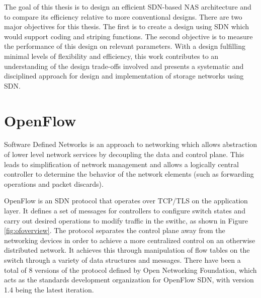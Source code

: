 The goal of this thesis is to design an efficient SDN-based NAS architecture and to compare its efficiency relative to more conventional designs. There are two major objectives for this thesis. The first is to create a design using SDN which would support coding and striping functions. The second objective is to measure the performance of this design on relevant parameters. With a design fulfilling minimal levels of flexibility and efficiency, this work contributes to an understanding of the design trade-offs involved and presents a systematic and disciplined approach for design and implementation of storage networks using SDN.


\section{OpenFlow}

\indent 
Software Defined Networks is an approach to networking which allows abstraction of lower level network services by decoupling the data and control plane. This leads to simplification of network management and allows a logically central controller to determine the behavior of the network elements (such as forwarding operations and packet discards). %
\begin{comment}
\setlength{\belowcaptionskip}{-10pt}

\begin{figure}
\centering
\texttt{[image: figures/topo.png]}
\caption{SDN Overview}
\label{fig:sdnoverview}
\end{figure}
\end{comment}
OpenFlow \cite{ofspec} is an SDN protocol that operates over TCP/TLS on the application layer. It defines a set of messages for controllers to configure switch states and carry out desired operations to modify traffic in the swithc, as shown in Figure \ref{fig:ofoverview}. The protocol separates the control plane away from the networking devices in order to achieve a more centralized control on an otherwise distributed network. It achieves this through manipulation of flow tables on the switch through a variety of data structures and messages. There have been a total of 8 versions of the protocol defined by Open Networking Foundation, which acts as the standards development organization for OpenFlow SDN, with version 1.4 being the latest iteration. 

